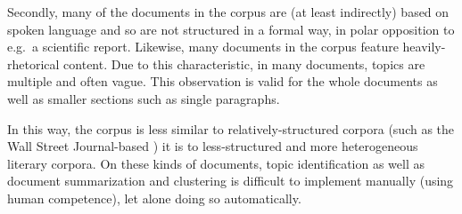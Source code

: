 Secondly, many of the documents in the corpus are (at least indirectly) based on spoken language and so are not structured in a formal way, in polar opposition to e.g.\ a scientific report. Likewise, many documents in the corpus feature heavily-rhetorical content. Due to this characteristic, in many documents, topics are multiple and often vague. This observation is valid for the whole documents as well as smaller sections such as single paragraphs. 

In this way, the corpus is less similar to relatively-structured corpora (such as the Wall Street Journal-based \citeauthor{PTB}) it is to less-structured and more heterogeneous literary corpora. On these kinds of documents, topic identification as well as document summarization and clustering is difficult to implement manually (using human competence), let alone doing so automatically.
